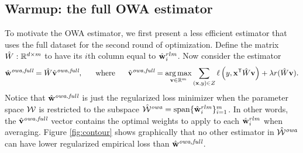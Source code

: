 \documentclass[thesis.tex]{subfiles}
\begin{document}
\subsection{Warmup: the full OWA estimator}

To motivate the OWA estimator,
we first present a less efficient estimator that uses the full dataset for the second round of optimization.
Define the matrix $\hat W : \mathbb{R}^{d\times m}$ to have its $i$th column equal to $\hat{\mathbf w}^{rlm}_i$. 
Now consider the estimator
\begin{equation}
\hat{\mathbf w}^{\textit{owa,full}} = \hat W \hat{\mathbf{v}}^{\textit{owa,full}}
,
\text{~~~~~where~~~~~}
\label{eq:vfull}
\hat{\mathbf{v}}^{\textit{owa,full}} = \operatorname*{arg\,max}_{\mathbf{v}\in\mathbb R^m} \sum _{(\mathbf{x},y)\in Z} \ell\left(y,{\mathbf{x}}^{\mathsf{T}} \hat W \mathbf{v} \right)
+
\lambda r(\hat W\mathbf{v})
.
\end{equation}
Notice that $\hat{\mathbf w}^{\textit{owa,full}}$ is just the regularized loss minimizer when the parameter space ${\mathcal W}$ is restricted to the subspace ${\hat {{\mathcal W}}^{\textit{owa}}}=\operatorname*{span}\{\hat{\mathbf w}^{rlm}_i\}_{i=1}^m$.
In other words, the $\hat{\mathbf{v}}^{\textit{owa,full}}$ vector contains the optimal weights to apply to each $\hat{\mathbf w}^{rlm}_i$ when averaging.
Figure \ref{fig:contour} shows graphically that no other estimator in ${\hat {{\mathcal W}}^{\textit{owa}}}$ can have lower regularized empirical loss than $\hat{\mathbf w}^{\textit{owa,full}}$.
\end{document}
